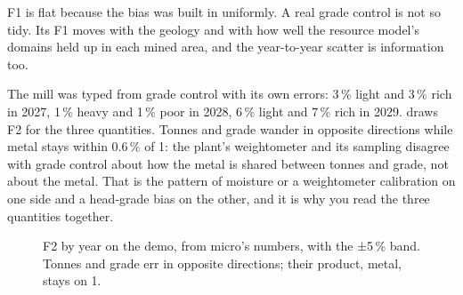 
F1 is flat because the bias was built in uniformly. A real grade control is not so tidy. Its F1 moves with the geology and with how well the resource model's domains held up in each mined area, and the year-to-year scatter is information too.

The mill was typed from grade control with its own errors: 3\,\% light and 3\,\% rich in 2027, 1\,\% heavy and 1\,\% poor in 2028, 6\,\% light and 7\,\% rich in 2029.  draws F2 for the three quantities. Tonnes and grade wander in opposite directions while metal stays within 0.6\,\% of 1: the plant's weightometer and its sampling disagree with grade control about how the metal is shared between tonnes and grade, not about the metal. That is the pattern of moisture or a weightometer calibration on one side and a head-grade bias on the other, and it is why you read the three quantities together.

\begin{figure}[htbp]\centering
\caption{F2 by year on the demo, from micro's numbers, with the ±5\,\% band. Tonnes and grade err in opposite directions; their product, metal, stays on 1.}\label{fig:factors-f2}
\end{figure}

